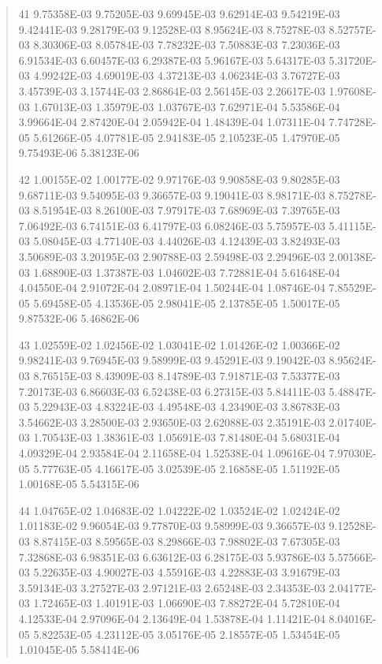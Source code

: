 \documentclass[letterpaper,10pt,english]{sphinxmanual}
\begin{document}
\begin{quote}
\begin{DUlineblock}{0em}
\item[] 41   9.75358E-03  9.75205E-03  9.69945E-03  9.62914E-03  9.54219E-03  9.42441E-03  9.28179E-03  9.12528E-03  8.95624E-03  8.75278E-03  8.52757E-03  8.30306E-03  8.05784E-03  7.78232E-03  7.50883E-03  7.23036E-03  6.91534E-03  6.60457E-03  6.29387E-03  5.96167E-03  5.64317E-03  5.31720E-03  4.99242E-03  4.69019E-03  4.37213E-03  4.06234E-03  3.76727E-03  3.45739E-03  3.15744E-03  2.86864E-03  2.56145E-03  2.26617E-03  1.97608E-03  1.67013E-03  1.35979E-03  1.03767E-03  7.62971E-04  5.53586E-04  3.99664E-04  2.87420E-04  2.05942E-04  1.48439E-04  1.07311E-04  7.74728E-05  5.61266E-05  4.07781E-05  2.94183E-05  2.10523E-05  1.47970E-05  9.75493E-06  5.38123E-06
\item[] 42   1.00155E-02  1.00177E-02  9.97176E-03  9.90858E-03  9.80285E-03  9.68711E-03  9.54095E-03  9.36657E-03  9.19041E-03  8.98171E-03  8.75278E-03  8.51954E-03  8.26100E-03  7.97917E-03  7.68969E-03  7.39765E-03  7.06492E-03  6.74151E-03  6.41797E-03  6.08246E-03  5.75957E-03  5.41115E-03  5.08045E-03  4.77140E-03  4.44026E-03  4.12439E-03  3.82493E-03  3.50689E-03  3.20195E-03  2.90788E-03  2.59498E-03  2.29496E-03  2.00138E-03  1.68890E-03  1.37387E-03  1.04602E-03  7.72881E-04  5.61648E-04  4.04550E-04  2.91072E-04  2.08971E-04  1.50244E-04  1.08746E-04  7.85529E-05  5.69458E-05  4.13536E-05  2.98041E-05  2.13785E-05  1.50017E-05  9.87532E-06  5.46862E-06
\item[] 43   1.02559E-02  1.02456E-02  1.03041E-02  1.01426E-02  1.00366E-02  9.98241E-03  9.76945E-03  9.58999E-03  9.45291E-03  9.19042E-03  8.95624E-03  8.76515E-03  8.43909E-03  8.14789E-03  7.91871E-03  7.53377E-03  7.20173E-03  6.86603E-03  6.52438E-03  6.27315E-03  5.84411E-03  5.48847E-03  5.22943E-03  4.83224E-03  4.49548E-03  4.23490E-03  3.86783E-03  3.54662E-03  3.28500E-03  2.93650E-03  2.62088E-03  2.35191E-03  2.01740E-03  1.70543E-03  1.38361E-03  1.05691E-03  7.81480E-04  5.68031E-04  4.09329E-04  2.93584E-04  2.11658E-04  1.52538E-04  1.09616E-04  7.97030E-05  5.77763E-05  4.16617E-05  3.02539E-05  2.16858E-05  1.51192E-05  1.00168E-05  5.54315E-06
\item[] 44   1.04765E-02  1.04683E-02  1.04222E-02  1.03524E-02  1.02424E-02  1.01183E-02  9.96054E-03  9.77870E-03  9.58999E-03  9.36657E-03  9.12528E-03  8.87415E-03  8.59565E-03  8.29866E-03  7.98802E-03  7.67305E-03  7.32868E-03  6.98351E-03  6.63612E-03  6.28175E-03  5.93786E-03  5.57566E-03  5.22635E-03  4.90027E-03  4.55916E-03  4.22883E-03  3.91679E-03  3.59134E-03  3.27527E-03  2.97121E-03  2.65248E-03  2.34353E-03  2.04177E-03  1.72465E-03  1.40191E-03  1.06690E-03  7.88272E-04  5.72810E-04  4.12533E-04  2.97096E-04  2.13649E-04  1.53878E-04  1.11421E-04  8.04016E-05  5.82253E-05  4.23112E-05  3.05176E-05  2.18557E-05  1.53454E-05  1.01045E-05  5.58414E-06

\end{DUlineblock}
\end{quote}
\end{document}
